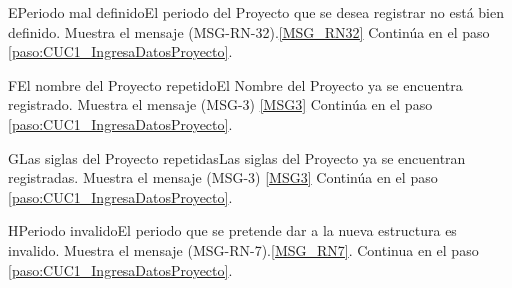 	\begin{UCtrayectoriaA}{E}{Periodo mal definido}{El periodo del Proyecto que se desea registrar no está bien definido.}
			\UCpaso Muestra el mensaje (MSG-RN-32).\ref{MSG_RN32}
			\UCpaso Continúa en el paso \ref{paso:CUC1_IngresaDatosProyecto}.
	\end{UCtrayectoriaA}


	\begin{UCtrayectoriaA}{F}{El nombre del Proyecto repetido}{El Nombre del Proyecto ya se encuentra registrado.}
			\UCpaso Muestra el mensaje (MSG-3) \ref{MSG3}
			\UCpaso Continúa en el paso \ref{paso:CUC1_IngresaDatosProyecto}.
	\end{UCtrayectoriaA}
	
	\begin{UCtrayectoriaA}{G}{Las siglas del Proyecto repetidas}{Las siglas del Proyecto ya se encuentran registradas.}
			\UCpaso Muestra el mensaje (MSG-3) \ref{MSG3}
			\UCpaso Continúa en el paso \ref{paso:CUC1_IngresaDatosProyecto}.
	\end{UCtrayectoriaA}

	\begin{UCtrayectoriaA}{H}{Periodo invalido}{El periodo que se pretende dar a la nueva estructura es invalido.}
		\UCpaso Muestra el mensaje (MSG-RN-7).\ref{MSG_RN7}.
		\UCpaso Continua en el paso \ref{paso:CUC1_IngresaDatosProyecto}.
	\end{UCtrayectoriaA}






















